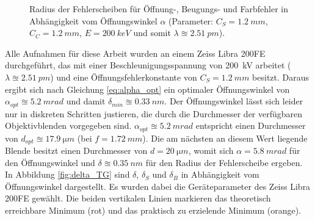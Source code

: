 \documentclass[
	paper=a4,				%
	twoside=true,			%
	BCOR=6mm,				%
	fontsize=12pt,			%
	pagesize=auto,			%
	numbers=noenddot,		%
	bibliography=totoc,		%
	draft=false
]{scrartcl}
\begin{document}
\begin{figure}
	\centering
	\caption{Radius der Fehlerscheiben für Öffnung-, Beugungs- und Farbfehler in Abhängigkeit vom Öffnungswinkel $\alpha$ (Parameter: $C_S = \SI{1,2}{mm}$, $C_C = \SI{1,2}{mm}$, $E=\SI{200}{keV}$ und somit $\lambda\approxeq \SI{2,51}{pm}$).}
\end{figure}

Alle Aufnahmen für diese Arbeit wurden an einem Zeiss Libra 200FE durchgeführt, das mit einer Beschleunigungsspannung von \SI{200}{kV} arbeitet ($\lambda\approxeq\SI{2,51}{pm}$) und eine Öffnungsfehlerkonstante von $C_S=\SI{1,2}{mm}$ besitzt. Daraus ergibt sich nach Gleichung \ref{eq:alpha_opt} ein optimaler Öffnungswinkel von $\alpha_{opt}\approxeq\SI{5,2}{mrad}$ und damit $\delta_{min}\approxeq\SI{0,33}{nm}$. Der Öffnungswinkel lässt sich leider nur in diskreten Schritten justieren, die durch die Durchmesser der verfügbaren Objektivblenden vorgegeben sind. $\alpha_{opt}\approxeq\SI{5,2}{mrad}$ entspricht einen Durchmesser von $d_{opt}\approxeq\SI{17,9}{\micro m}$ (bei $f=\SI{1,72}{mm}$). Die am nächsten an diesem Wert liegende Blende besitzt einen Durchmesser von $d=\SI{20}{\micro m}$, womit sich $\alpha=\SI{5,8}{mrad}$ für den Öffnungswinkel und $\delta\approxeq\SI{0,35}{nm}$ für den Radius der Fehlerscheibe ergeben. In Abbildung \ref{fig:delta_TG} sind $\delta$, $\delta_S$ und $\delta_B$ in Abhängigkeit vom Öffnungswinkel dargestellt. Es wurden dabei die Geräteparameter des Zeiss Libra 200FE gewählt. Die beiden vertikalen Linien markieren das theoretisch erreichbare Minimum (rot) und das praktisch zu erzielende Minimum (orange).
\end{document}
